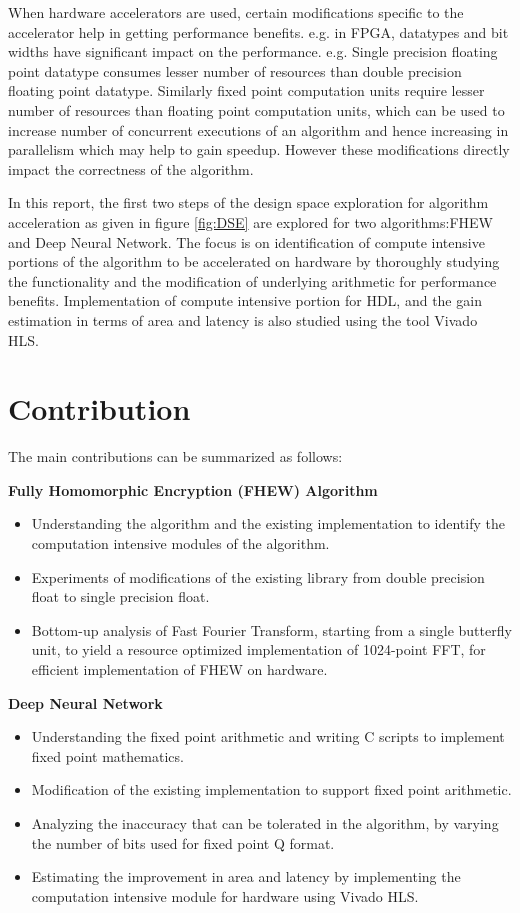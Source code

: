  When hardware accelerators are used, certain modifications specific to the accelerator help in getting performance benefits. e.g. in FPGA, datatypes and bit widths have significant impact on the performance. e.g. Single precision floating point datatype consumes lesser number of resources than double precision floating point datatype. Similarly fixed point computation units require lesser number of resources than floating point computation units, which can be used to increase number of concurrent executions of an algorithm and hence increasing in parallelism which may help to gain speedup. However these modifications directly impact the correctness of the algorithm. 
 
\vspace{0.25cm}
In this report, the first two steps of the design space exploration for algorithm acceleration as given in figure \ref{fig:DSE} are explored for two algorithms:FHEW and Deep Neural Network. The focus is on identification of compute intensive portions of the algorithm to be accelerated on hardware by thoroughly studying the functionality and the modification of underlying arithmetic for performance benefits. Implementation of compute intensive portion for HDL, and the gain estimation in terms of area and latency is also studied using the tool Vivado HLS.


\section{Contribution}
The main contributions can be summarized as follows:

\vspace{0.25cm}
\textbf{Fully Homomorphic Encryption (FHEW) Algorithm}
\begin{itemize}
\item
Understanding the algorithm and the existing implementation to identify the computation intensive modules of the algorithm. 
\item
Experiments of modifications of the existing library from double precision float to single precision float.
\item
Bottom-up analysis of Fast Fourier Transform, starting from a single butterfly unit, to yield a resource optimized implementation of 1024-point FFT, for efficient implementation of FHEW on hardware.
\end{itemize}

\textbf{Deep Neural Network}
\begin{itemize}
\item
Understanding the fixed point arithmetic and writing C scripts to implement fixed point mathematics.
\item
Modification of the existing implementation to support fixed point arithmetic.
\item
Analyzing the inaccuracy that can be tolerated in the algorithm, by varying the number of bits used for fixed point Q format. 
\item
Estimating the improvement in area and latency by implementing the computation intensive module for hardware using Vivado HLS. 
\end{itemize}


